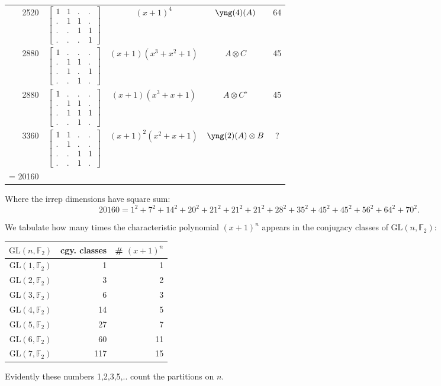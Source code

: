 \documentclass[11pt,oneside]{article}
\newcommand{\GL}{\mathrm{GL}}
\newcommand{\Field}{\mathbb{F}}
\newcommand{\tensor}{\otimes}
\begin{document}
\begin{center}
\begin{tabular}{r|l|c|c|c}
2520  & $\begin{bmatrix}1&1&.&.\\.&1&1&.\\.&.&1&1\\.&.&.&1\end{bmatrix}$  & $(x+1)^4$  & $\yng(4)(A)$ & 64   \\
2880  & $\begin{bmatrix}1&.&.&.\\.&1&1&.\\.&1&.&1\\.&.&1&.\end{bmatrix}$
  & $(x+1)(x^3+x^2+1)$  & $A\tensor C$ & 45   \\
2880  & $\begin{bmatrix}1&.&.&.\\.&1&1&.\\.&1&1&1\\.&.&1&.\end{bmatrix}$
  & $(x+1)(x^3+x+1)$  & $A\tensor C^{\star}$ & 45   \\
3360  & $\begin{bmatrix}1&1&.&.\\.&1&.&.\\.&.&1&1\\.&.&1&.\end{bmatrix}$  & $(x+1)^2(x^2+x+1)$  & $\yng(2)(A)\tensor B$ & ?  \\
\hline
\strut = 20160 \\
\end{tabular}
\end{center}

Where the irrep dimensions have square sum:
$$
 20160 = 1^2 + 7^2 + 14^2 + 20^2 + 21^2 + 21^2 + 21^2 + 28^2 + 35^2 + 45^2 + 45^2 + 56^2 + 64^2 + 70^2.
$$

We tabulate how many times the characteristic polynomial $(x+1)^n$ appears
in the conjugacy classes of $\GL(n,\Field_2)$:
\begin{center}\begin{tabular}{c|r|r}
$\GL(n,\Field_2)$ & cgy. classes  & \# $(x+1)^n$ \\
\hline
$\GL(1,\Field_2)$  & 1    & 1 \\
$\GL(2,\Field_2)$  & 3    & 2 \\
$\GL(3,\Field_2)$  & 6   & 3 \\
$\GL(4,\Field_2)$  & 14   & 5 \\
$\GL(5,\Field_2)$  & 27   & 7 \\
$\GL(6,\Field_2)$  & 60   & 11 \\
$\GL(7,\Field_2)$  & 117   & 15 \\
\end{tabular} \end{center}
Evidently these numbers 1,2,3,5,.. count the partitions on $n$.
\end{document}
